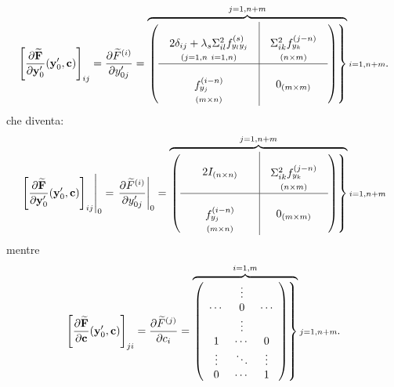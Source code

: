 \[\left[\frac{\partial{\bf\widetilde F}}{\partial{\bf y}^\prime_0}({\bf y}^\prime_0,{\bf c})\right]_{ij}=\frac{\partial \widetilde F^{(i)}}{\partial y^\prime_{0j}}=\overbrace{\left.\left(\begin{array}{c|c}\mbox{$\begin{array}{c} \\2\delta_{ij}+\lambda_s\Sigma^2_{il}f^{(s)}_{y_ly_j}\\{\scriptstyle (j=1,n\ i=1,n)} \end{array}$}&\mbox{$\begin{array}{c} \\ \Sigma^2_{ik}f^{(j-n)}_{y_k}  \\{\scriptstyle (n\times m)} \end{array}$}\\ \hline\mbox{$\begin{array}{c} \\ f^{(i-n)}_{y_j} \\{\scriptstyle (m\times n)} \end{array}$}&0_{(m\times m)}\end{array}\right)\right\}}^{j=1,n+m}{\scriptstyle i=1,n+m}.\]
che diventa:
\begin{equation}
\label{dfdyprime3}
\left.\left[\frac{\partial{\bf\widetilde F}}{\partial{\bf y}^\prime_0}({\bf y}^\prime_0,{\bf c})\right]_{ij}\right|_0=\left.\frac{\partial \widetilde F^{(i)}}{\partial y^\prime_{0j}}\right|_0=\overbrace{\left.\left(\begin{array}{c|c}\mbox{$\begin{array}{ccc} & & \\ & 2I_{(n\times n)} & \\& &  \end{array}$}&\mbox{$\begin{array}{c}\\  \Sigma^2_{ik}f^{(j-n)}_{y_k}  \\{\scriptstyle (n\times m)} \end{array}$}\\ \hline\mbox{$\begin{array}{c} \\f^{(i-n)}_{y_j} \\ {\scriptstyle (m\times n)} \end{array}$}&0_{(m\times m)}\end{array}\right)\right\}}^{j=1,n+m}{\scriptstyle i=1,n+m}
\end{equation}
mentre
\[\left[\frac{\partial{\bf\widetilde F}}{\partial{\bf c}}({\bf y}^\prime_0,{\bf c})\right]_{ji}=\frac{\partial\widetilde F^{(j)}}{\partial c_i}=\overbrace{\left.\left(\begin{array}{ccc}  &\vdots& \\ \cdots &0&\cdots \\ &\vdots& \\1 &\cdots&0 \\\vdots &\ddots&\vdots\\0&\cdots&1  \end{array}\right)\right\}}^{i=1,m}{\scriptstyle j=1,n+m}.\]
